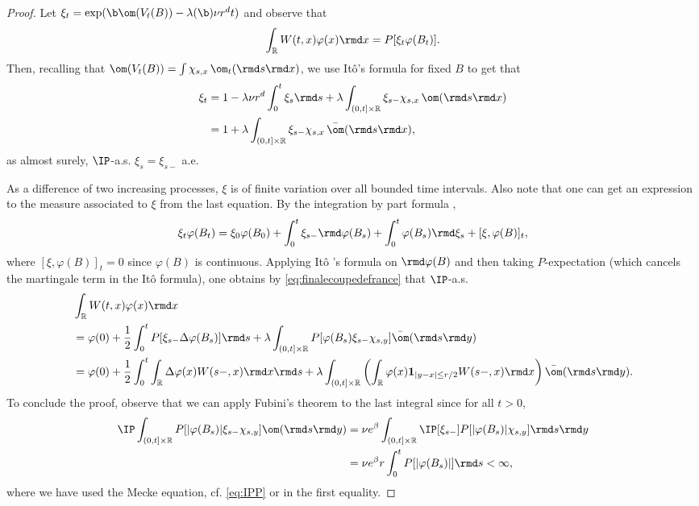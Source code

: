 \begin{proof} Let $\xi_t = \exp(\b \om(V_t(B)) - \lambda(\b)\nu r^d t)$ and observe that 
\begin{equation*}\int_\mathbb{R} W(t,x)\varphi(x)\rmd x = P[\xi_t \varphi(B_t)].
\end{equation*} 
Then, recalling that $\om(V_t(B)) = \int \chi_{s,x} \, \om_t(\rmd s \rmd x)$, we use It\^o's formula \cite[Section II.5]{IkedaWatanabe} for fixed $B$ to get that
\begin{align} \label{eq:finalecoupedefrance}
\nonumber \xi_t &= 1 -\lambda \nu r^d \int_0^t \xi_s \rmd s + \lambda \int_{(0,t]\times \mathbb{R}} \xi_{s-} \chi_{s,x} \, \om(\rmd s \rmd x)\\
& = 1 + \lambda\int_{(0,t]\times \mathbb{R}} \xi_{s-} \chi_{s,x} \, \bar{\om}(\rmd s \rmd x),
\end{align} as almost surely, $\IP$-a.s. $\xi_s = \xi_{s-}$ a.e.

As a difference of two increasing processes, $\xi$ is of finite variation over all bounded time intervals. Also note that one can get an expression to the measure associated to $\xi$ from the last equation. By the integration by part formula \cite[p.52]{jacod2013limit},
\[ \xi_t \varphi(B_t) = \xi_0 \varphi(B_0) + \int_0^t \xi_{s-} \rmd \varphi(B_s) + \int_0^t \varphi(B_s) \rmd \xi_s + [\xi,\varphi(B)]_t,\]
where $[\xi,\varphi(B)]_t=0$ since $\varphi(B)$ is continuous. Applying It\^o 's formula on $\rmd \varphi(B)$ and then taking $P$-expectation (which cancels the martingale term in the It\^o formula), one obtains by \eqref{eq:finalecoupedefrance} that $\IP$-a.s.
\begin{align*}
&\int_\mathbb{R} W(t,x)\varphi(x)\rmd x\\
&  = \varphi(0) + \frac{1}{2}\int_0^t P[\xi_{s-} \Delta \varphi(B_s)] \rmd s + \lambda \int_{(0,t]\times\mathbb R} P[\varphi(B_s) \xi_{s-} \chi_{s,y}]\bar{\om}(\rmd s \rmd y)\\
& = \varphi(0) + \frac{1}{2}\int_0^t \int_\mathbb R \Delta \varphi(x) W(s-,x) \rmd x \rmd s + \lambda \int_{(0,t]\times\mathbb R} \left(\int_\mathbb R \varphi(x) \mathbf{1}_{|y-x|\leq r/2} W(s-,x) \rmd x\right) \bar{\om}(\rmd s \rmd y).
\end{align*}
To conclude the proof, observe that we can apply Fubini's theorem to the last integral since for all $t>0$,
\begin{align*}
\IP \int_{(0,t] \times \mathbb{R}} P[|\varphi(B_s)|\xi_{s-} \chi_{s,y}] \om(\rmd s \rmd y) &= \nu e^\beta \int_{(0,t] \times \mathbb{R}} \IP[\xi_{s-}] P[|\varphi(B_s)| \chi_{s,y}] \rmd s \rmd y\\
& = \nu e^\beta r \int_0^t P[|\varphi(B_s)|] \rmd s < \infty,
\end{align*}
where we have used the Mecke equation, cf. \eqref{eq:IPP} or \cite[4.1]{LastPenrose} in the first equality.
\end{proof}

